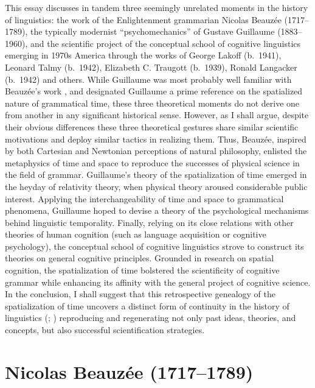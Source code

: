 \documentclass[english,output=paper,colorlinks,citecolor=brown]{../langscibook}
\begin{document}
 This essay discusses in tandem three seemingly unrelated moments in the history of linguistics: the work of the Enlightenment grammarian Nicolas Beauzée (1717–1789), the typically modernist “psychomechanics” of Gustave Guillaume (1883–1960), and the scientific project of the conceptual school of cognitive linguistics emerging in 1970s America through the works of George Lakoff (b.~1941), Leonard Talmy (b.~1942), Elizabeth C. Traugott (b.~1939), Ronald Langacker (b.~1942) and others. While Guillaume was most probably well familiar with Beau\-zée’s work \citep{Fournier2013}, and \citet{Traugott1975} designated Guillaume a prime reference on the spatialized nature of grammatical time, these three theoretical moments do not derive one from another in any significant historical sense. However, as I shall argue, despite their obvious differences these three theoretical gestures share similar scientific motivations and deploy similar tactics in realizing them. Thus, Beauzée, inspired by both Cartesian and Newtonian perceptions of natural philosophy, enlisted the metaphysics of time and space to reproduce the successes of physical science in the field of grammar. Guillaume’s theory of the spatialization of time emerged in the heyday of relativity theory, when physical theory aroused considerable public interest. Applying the interchangeability of time and space to grammatical phenomena, Guillaume hoped to devise a theory of the psychological mechanisms behind linguistic temporality. Finally, relying on its close relations with other theories of human cognition (such as language acquisition or cognitive psychology), the conceptual school of cognitive linguistics strove to construct its theories on general cognitive principles. Grounded in research on spatial cognition, the spatialization of time bolstered the scientificity of cognitive grammar while enhancing its affinity with the general project of cognitive science. In the conclusion, I shall suggest that this retrospective genealogy of the spatialization of time uncovers a distinct form of continuity in the history of linguistics (\citealt{Auroux1980}; \citealt{ColombatEtAl2010}) reproducing and regenerating not only past ideas, theories, and concepts, but also successful scientification strategies.
 
 \section{Nicolas Beauzée (1717–1789)}
 
\end{document}

